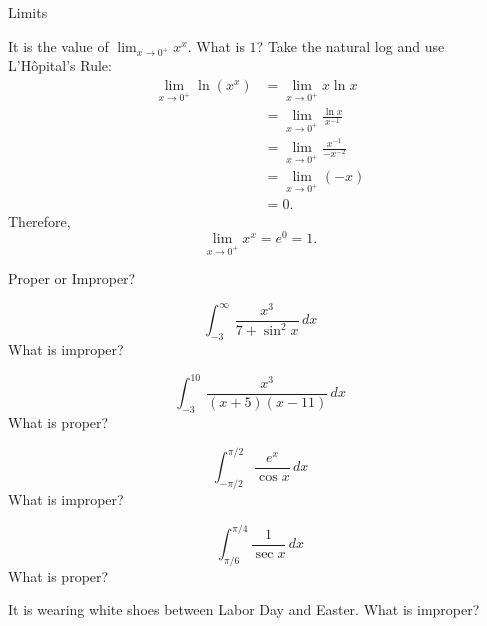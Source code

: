\documentclass{article}
\begin{document}
\begin{category}{Limits}
  \begin{clue}[say]
    It is the value of $\displaystyle\lim_{x\to 0^{+}}x^x.$
  \response
    What is $1$?
  \solution
    Take the natural log and use L'H\^opital's Rule:
    \begin{align*}
    \lim_{x\to 0^{+}}\ln \left(x^{x}\right)
    &= \lim_{x\to 0^{+}}x\ln x \\
    &= \lim_{x\to 0^{+}}\frac{\ln x}{x^{-1}} \\
    &= \lim_{x\to 0^{+}}\frac{x^{-1}}{-x^{-2}} \\
    &= \lim_{x\to 0^{+}}(-x) \\
    &= 0.
    \end{align*}
    Therefore,
    \[
    \lim_{x\to 0^{+}} x^{x} = e^{0} = 1.
    \]
  \end{clue}

\end{category}

\begin{category}{Proper or Improper?}

  \begin{clue}[say]
    \[ \int_{-3}^{\infty} \frac{x^{3}}{7+ \sin^{2} x} \, dx \]
  \response
    What is improper?
  \end{clue}

  \begin{clue}[say]
    \[ \int_{-3}^{10} \frac{x^{3}}{(x+5)(x-11)} \, dx \]
  \response
    What is proper?
  \end{clue}

  \begin{clue}[say]
    \[ \int_{-\pi/2}^{\pi/2} \frac{e^{x}}{\cos x} \, dx \]
  \response
    What is improper?
  \end{clue}

  \begin{clue}[say]
    \[ \int_{\pi/6}^{\pi/4} \frac{1}{\sec x} \, dx \]
  \response
    What is proper?
  \end{clue}

  \begin{clue}[say]
    It is wearing white shoes between Labor Day and Easter.
  \response
    What is improper?
  \end{clue}

\end{category}
\end{document}
